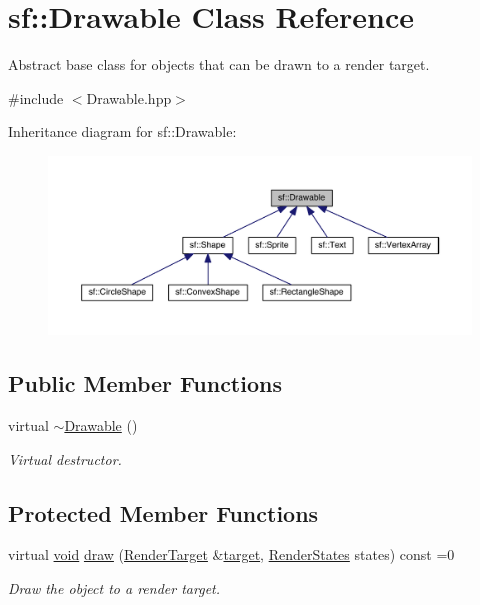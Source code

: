 \hypertarget{classsf_1_1_drawable}{\section{sf\-:\-:Drawable Class Reference}
\label{classsf_1_1_drawable}
}


Abstract base class for objects that can be drawn to a render target.  




{\ttfamily \#include $<$Drawable.\-hpp$>$}



Inheritance diagram for sf\-:\-:Drawable\-:
\nopagebreak
\begin{figure}[H]
\begin{center}
\leavevmode
\includegraphics[width=350pt]{classsf_1_1_drawable__inherit__graph}
\end{center}
\end{figure}
\subsection*{Public Member Functions}
\begin{DoxyCompactItemize}
\item 
virtual \hyperlink{classsf_1_1_drawable_a906002f2df7beb5edbddf5bbef96f120}{$\sim$\-Drawable} ()
\begin{DoxyCompactList}\small\item\em Virtual destructor. \end{DoxyCompactList}\end{DoxyCompactItemize}
\subsection*{Protected Member Functions}
\begin{DoxyCompactItemize}
\item 
virtual \hyperlink{glutf90_8h_ac778d6f63f1aaf8ebda0ce6ac821b56e}{void} \hyperlink{classsf_1_1_drawable_a90d2c88bba9b035a0844eccb380ef631}{draw} (\hyperlink{classsf_1_1_render_target}{Render\-Target} \&\hyperlink{gl3ext_8h_af9d0cbbbeb7414e786c41899e5a856d7}{target}, \hyperlink{classsf_1_1_render_states}{Render\-States} states) const =0
\begin{DoxyCompactList}\small\item\em Draw the object to a render target. \end{DoxyCompactList}\end{DoxyCompactItemize}
